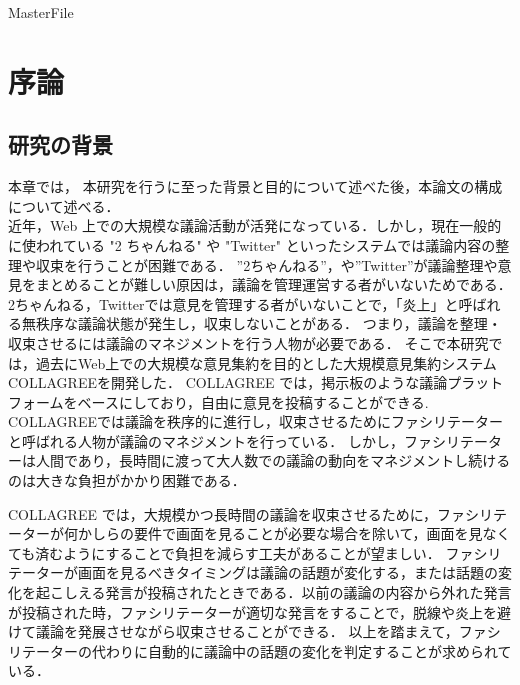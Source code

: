 \expandafter\ifx\csname MasterFile\endcsname\relax
	\def\SubFile{hoge}
	
	
	\setcounter{chapter}{0}
	\fi
\cleardoublepage
\chapter{序論}
\label{intro:chapter}
\section{研究の背景}
\label{intro:background}
本章では， 本研究を行うに至った背景と目的について述べた後，本論文の構成について述べる．\\
近年，Web 上での大規模な議論活動が活発になっている．しかし，現在一般的に使われている "2 ちゃんねる" や "Twitter" といったシステムでは議論内容の整理や収束を行うことが困難である．
”2ちゃんねる”，や”Twitter”が議論整理や意見をまとめることが難しい原因は，議論を管理運営する者がいないためである． 2ちゃんねる，Twitterでは意見を管理する者がいないことで，「炎上」と呼ばれる無秩序な議論状態が発生し，収束しないことがある．
つまり，議論を整理・収束させるには議論のマネジメントを行う人物が必要である．
そこで本研究では，過去にWeb上での大規模な意見集約を目的とした大規模意見集約システムCOLLAGREE\cite{collagreeTest}を開発した．
COLLAGREE では，掲示板のような議論プラットフォームをベースにしており，自由に意見を投稿することができる.
COLLAGREEでは議論を秩序的に進行し，収束させるためにファシリテーターと呼ばれる人物が議論のマネジメントを行っている．
しかし，ファシリテーターは人間であり，長時間に渡って大人数での議論の動向をマネジメントし続けるのは大きな負担がかかり困難である．

COLLAGREE では，大規模かつ長時間の議論を収束させるために，ファシリテーターが何かしらの要件で画面を見ることが必要な場合を除いて，画面を見なくても済むようにすることで負担を減らす工夫があることが望ましい．
ファシリテーターが画面を見るべきタイミングは議論の話題が変化する，または話題の変化を起こしえる発言が投稿されたときである．以前の議論の内容から外れた発言が投稿された時，ファシリテーターが適切な発言をすることで，脱線や炎上を避けて議論を発展させながら収束させることができる．
以上を踏まえて，ファシリテーターの代わりに自動的に議論中の話題の変化を判定することが求められている．

